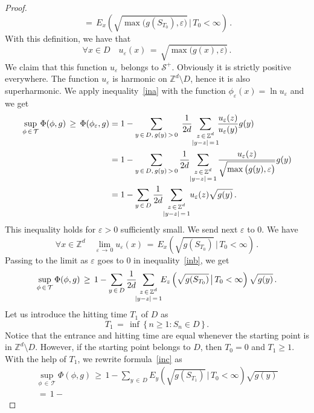 \documentclass[10pt]{amsart}
\theoremstyle{definition}\newtheorem{defi}[theo]{Definition}\newtheorem{rema}[theo]{Remark}\newtheorem{exam}[theo]{Example}\newtheorem{exem}[theo]{Example}\newtheorem{nota}[theo]{Notation}
\newcommand{\tatop}[2]{\genfrac{}{}{0pt}{1}{#1}{#2}}
\newcommand*\Zd {{\mathbb Z^d}}
\newcommand*\T{\mathcal{T}}
\newcommand{\cS}{\mathcal{S}}
\let\oldforall\forall
\renewcommand*{\forall}{\mathrel{\oldforall}}
\begin{document}
\begin{proof}
\[\,=\,E_x\left(
\sqrt{\max\big(g(S_{T_0}),\varepsilon\big)}
\,\big|\,T_0<\infty\right)\,.
\]
With this definition, we have that
\[
\forall x\in D\quad u_\varepsilon(x)
\,=\,\sqrt{\max\big(g(x),\varepsilon\big)}\,.
\]
We claim that this function $u_\varepsilon$ belongs to $\cS^+$. Obviously it is strictly positive everywhere. The function $u_\varepsilon$ is harmonic on $\Zd\setminus D$, hence it is also superharmonic. We apply inequality~\eqref{ina} with the function $\phi_\varepsilon(x)=\ln u_\varepsilon$ and we get
\begin{equation}\label{inb}
\begin{aligned}
{\sup_{\phi\,\in\,\T} \Phi(\phi,g)}
\,\geq\,
\Phi(\phi_\varepsilon,g) &= 1 -
\sum_{y\,\in\,D,\,g(y)\,>\,0}\;
\frac{1}{2d}
\!\!
\sum_{\tatop{z\,\in\,\Zd}{|y-z|\,=\,1}}
\!\!\!
\frac{u_\varepsilon(z)} {u_\varepsilon(y)} g(y)
\\
& = 1 -
\sum_{y\,\in\,D,\,g(y)\,>\,0}
\frac{1}{2d}
\!\!
\sum_{\tatop{z\,\in\,\Zd}{|y-z|\,=\,1}}
\!
\frac{u_\varepsilon(z)}{ \sqrt{\max\big(g(y),\varepsilon\big)}} g(y)
\\
&= 1 -
\sum_{y\,\in\,D}
\frac{1}{2d}
\!\!
\sum_{\tatop{z\,\in\,\Zd}{|y-z|\,=\,1}}
\!\! {u_\varepsilon(z)}{ \sqrt{g(y)}}
\,.
\end{aligned}
\end{equation}
This inequality holds for $\varepsilon>0$ sufficiently small. We send next $\varepsilon$ to $0$. We have
\[
\forall x\in \Zd\quad \lim_{\varepsilon\,\to\,0}u_\varepsilon(x)
\,=\,E_x\left(\sqrt{g(S_{T_0})} \,\big|\,T_0<\infty\right)\,.
\]
Passing to the limit as $\varepsilon$ goes to $0$ in inequality~\eqref{inb}, we get
\begin{equation}\label{inc}
{\sup_{\phi\,\in\,\T} \Phi(\phi,g)}
\,\geq\, 1 -
\sum_{y\,\in\,D}
\frac{1}{2d}
\!\!\!
\sum_{\tatop{z\,\in\,\Zd}{|y-z|\,=\,1}}
\!\!\! E_z\left(\sqrt{ g(S_{T_0}) } \,\big|\,T_0<\infty\right) { \sqrt{g(y)}}
\,.
\end{equation}
Let us introduce the hitting time $T_1$ of $D$ as
\[
T_1\,=\,\inf\,\big\{\,n\geq 1:S_n\in D\,\big\}\,.
\]
Notice that the entrance and hitting time are equal whenever the starting point is in $\Zd\setminus D$. However, if the starting point belongs to $D$, then $T_0=0$ and $T_1\geq 1$. With the help of $T_1$, we rewrite formula~\eqref{inc} as
\begin{multline}\label{ind}
{\sup_{\phi\,\in\,\T} \Phi(\phi,g)}
\,\geq\, 1 -
\sum_{y\,\in\,D} E_y\left(\sqrt{ g(S_{T_1}) } \,\big|\,T_0<\infty\right) { \sqrt{g(y)}}\\
\,=\, 1 -

\end{multline}
\end{proof}
\end{document}
